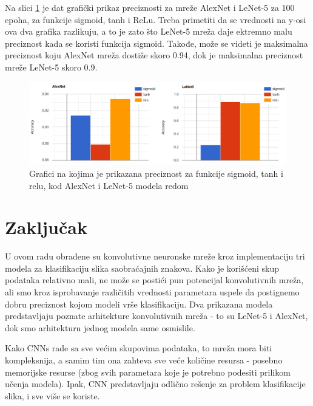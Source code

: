 \documentclass[a4paper]{article}
\begin{document}
\newpage
Na slici \ref{fig:grafici_lenet5_alexnet_acc} je dat grafički prikaz preciznosti za mreže AlexNet i LeNet-5 za 100 epoha, za funkcije sigmoid, tanh i ReLu. Treba primetiti da se vrednosti na y-osi ova dva grafika razlikuju, a to je zato što LeNet-5 mreža daje ektremno malu preciznost kada se koristi funkcija sigmoid. Takođe, može se videti je maksimalna preciznost koju AlexNet mreža dostiže skoro 0.94, dok je maksimalna preciznost mreže LeNet-5 skoro 0.9.


\begin{figure}[h!]
\begin{center}
\includegraphics[scale=0.5]{graphs_alexnet_lenet.png}
\end{center}
\caption{Grafici na kojima je prikazana preciznost za funkcije sigmoid, tanh i relu, kod AlexNet i LeNet-5 modela redom}
\label{fig:grafici_lenet5_alexnet_acc}
\end{figure}

\newpage


\section{Zaključak}
\label{sec:zakljucak}
U ovom radu obrađene su konvolutivne neuronske mreže kroz implementaciju tri modela za klasifikaciju slika saobraćajnih znakova. Kako je korišćeni skup podataka relativno mali, ne može se postići pun potencijal konvolutivnih mreža, ali smo kroz isprobavanje različitih vrednosti parametara uspele da postignemo dobru preciznost kojom modeli vrše klasifikaciju. Dva prikazana modela predstavljaju poznate arhitekture konvolutivnih mreža - to su LeNet-5 i AlexNet, dok smo arhitekturu jednog modela same osmislile.

Kako CNNs rade sa sve većim skupovima podataka, to mreža mora biti kompleksnija, a samim tim ona zahteva sve veće količine resursa - posebno memorijske resurse (zbog svih parametara koje je potrebno podesiti prilikom učenja modela). Ipak, CNN predstavljaju odlično rešenje za problem klasifikacije slika, i sve više se koriste.

\newpage

\appendix
 


\newpage

\appendix
\end{document}
